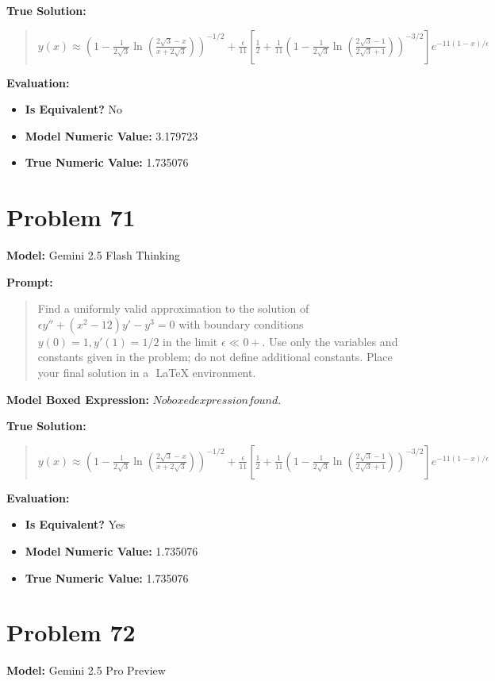 \documentclass{article}
\begin{document}
{\textbf{True Solution:}
\begin{quote}
$y(x) \approx \left( 1 - \frac{1}{2\sqrt{3}} \ln\left( \frac{2\sqrt{3}-x}{x+2\sqrt{3}} \right) \right)^{-1/2} + \frac{\epsilon}{11} \left[ \frac{1}{2} + \frac{1}{11} \left( 1 - \frac{1}{2\sqrt{3}} \ln\left( \frac{2\sqrt{3}-1}{2\sqrt{3}+1} \right) \right)^{-3/2} \right] e^{-11(1-x)/\epsilon}$
\end{quote}

\textbf{Evaluation:}
\begin{itemize}
\item \textbf{Is Equivalent?} No
\item \textbf{Model Numeric Value:} 3.179723
\item \textbf{True Numeric Value:} 1.735076
\end{itemize}
\vspace{1cm}
\section*{Problem 71}
\textbf{Model:} Gemini 2.5 Flash Thinking

\textbf{Prompt:}
\begin{quote}
Find a uniformly valid approximation to the solution of $\epsilon y'' + (x^2-12)y' - y^3 = 0$ with boundary conditions $y(0)=1, y'(1)=1/2$ in the limit $\epsilon \ll 0+$. Use only the variables and constants given in the problem; do not define additional constants. Place your final solution in a $\boxed{}$ LaTeX environment.
\end{quote}
\textbf{Model Boxed Expression:} $No boxed expression found.$

\textbf{True Solution:}
\begin{quote}
$y(x) \approx \left( 1 - \frac{1}{2\sqrt{3}} \ln\left( \frac{2\sqrt{3}-x}{x+2\sqrt{3}} \right) \right)^{-1/2} + \frac{\epsilon}{11} \left[ \frac{1}{2} + \frac{1}{11} \left( 1 - \frac{1}{2\sqrt{3}} \ln\left( \frac{2\sqrt{3}-1}{2\sqrt{3}+1} \right) \right)^{-3/2} \right] e^{-11(1-x)/\epsilon}$
\end{quote}

\textbf{Evaluation:}
\begin{itemize}
\item \textbf{Is Equivalent?} Yes
\item \textbf{Model Numeric Value:} 1.735076
\item \textbf{True Numeric Value:} 1.735076
\end{itemize}
\vspace{1cm}
\section*{Problem 72}
\textbf{Model:} Gemini 2.5 Pro Preview

}
\end{document}
